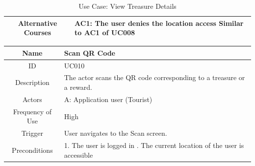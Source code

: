 \documentclass[12pt, a4paper, oneside]{article}
\begin{document}
\begin{table}[H]
\begin{tabularx}{\linewidth}{|c|X|}
Alternative Courses & AC1: The user denies the location access \newline Similar to AC1 of UC008                                                                                            \\ \hline
\end{tabularx}
\caption{Use Case: View Treasure Details}
\label{uc-view-treasure-details}
\end{table}

\begin{table}[H]
\begin{tabularx}{\linewidth}{|c|X|}
\hline
Name                & Scan QR Code                                                                                                                                                                                                                     \\ \hline
ID                  & UC010                                                                                                                                                                                                                       \\ \hline
Description         & The actor scans the QR code corresponding to a treasure or a reward.                                                                                                                                                   \\ \hline
Actors              & A: Application user (Tourist)                                                                                                                                                                                                 \\ \hline
Frequency of Use    & High                                                                                                                                                                                                                    \\ \hline
Trigger             & User navigates to the Scan screen.                                                                                                                                                                                           \\ \hline
Preconditions       & 1. The user is logged in  \newline 2. The current location of the user is accessible                                                                                                                                                                                                \\ \hline

\end{tabularx}
\end{table}
\end{document}
